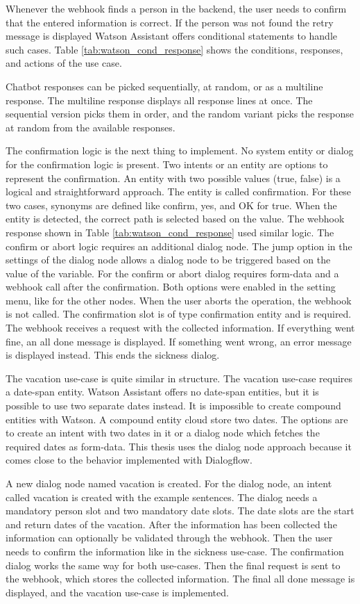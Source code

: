 Whenever the webhook finds a person in the backend, the user needs to confirm that the entered information is correct.
If the person was not found the retry message is displayed
Watson Assistant offers conditional statements to handle such cases.
Table \ref{tab:watson_cond_response} shows the conditions, responses, and actions of the use case.

Chatbot responses can be picked sequentially, at random, or as a multiline response.
The multiline response displays all response lines at once.
The sequential version picks them in order, and the random variant picks the response at random from the available responses.

The confirmation logic is the next thing to implement.
No system entity or dialog for the confirmation logic is present.
Two intents or an entity are options to represent the confirmation.
An entity with two possible values (true, false) is a logical and straightforward approach.
The entity is called confirmation.
For these two cases, synonyms are defined like confirm, yes, and OK for true.
When the entity is detected, the correct path is selected based on the value.
The webhook response shown in Table \ref{tab:watson_cond_response} used similar logic.
The confirm or abort logic requires an additional dialog node.
The jump option in the settings of the dialog node allows a dialog node to be triggered based on the value of the variable.
For the confirm or abort dialog requires form-data and a webhook call after the confirmation.
Both options were enabled in the setting menu, like for the other nodes.
When the user aborts the operation, the webhook is not called.
The confirmation slot is of type confirmation entity and is required.
The webhook receives a request with the collected information.
If everything went fine, an all done message is displayed.
If something went wrong, an error message is displayed instead.
This ends the sickness dialog.

The vacation use-case is quite similar in structure.
The vacation use-case requires a date-span entity.
Watson Assistant offers no date-span entities, but it is possible to use two separate dates instead.
It is impossible to create compound entities with Watson.
A compound entity cloud store two dates. 
The options are to create an intent with two dates in it or a dialog node 
which fetches the required dates as form-data.
This thesis uses the dialog node approach because it comes close to the 
behavior implemented with Dialogflow.

A new dialog node named vacation is created.
For the dialog node, an intent called vacation is created with 
the example sentences.
The dialog needs a mandatory person slot and two mandatory date slots.
The date slots are the start and return dates of the vacation.
After the information has been collected the information can optionally 
be validated through the webhook.
Then the user needs to confirm the information like in the sickness use-case.
The confirmation dialog works the same way for both use-cases.
Then the final request is sent to the webhook, which stores the collected information.
The final all done message is displayed, and the vacation use-case is implemented.

